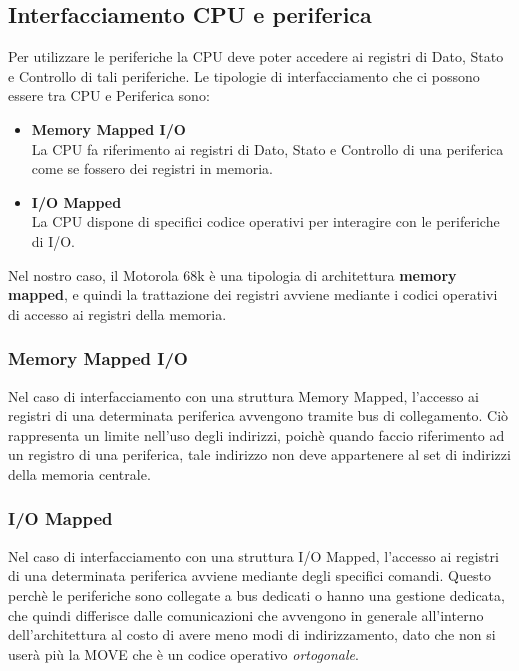 \subsection{Interfacciamento CPU e periferica}
Per utilizzare le periferiche la CPU deve poter accedere ai registri di Dato, Stato e Controllo di tali periferiche. Le tipologie di interfacciamento che ci possono essere tra CPU e Periferica sono:
\begin{itemize}
    \item \textbf{Memory Mapped I/O}\\ 
    La CPU fa riferimento ai registri di Dato, Stato e Controllo di una periferica come se fossero dei registri in memoria.
    \item \textbf{I/O Mapped}\\
    La CPU dispone di specifici codice operativi per interagire con le periferiche di I/O.
\end{itemize}

Nel nostro caso, il Motorola 68k è una tipologia di architettura \textbf{memory mapped}, e quindi la trattazione dei registri avviene mediante i codici operativi di accesso ai registri della memoria. 

\subsubsection{Memory Mapped I/O}
Nel caso di interfacciamento con una struttura Memory Mapped, l'accesso ai registri di una determinata periferica avvengono tramite bus di collegamento. Ciò rappresenta un limite nell'uso degli indirizzi, poichè quando faccio riferimento ad un registro di una periferica, tale indirizzo non deve appartenere al set di indirizzi della memoria centrale.

\subsubsection{I/O Mapped}
Nel caso di interfacciamento con una struttura I/O Mapped, l'accesso ai registri di una determinata periferica avviene mediante degli specifici comandi. Questo perchè le periferiche sono collegate a bus dedicati o hanno una gestione dedicata, che quindi differisce dalle comunicazioni che avvengono in generale all'interno dell'architettura al costo di avere meno modi di indirizzamento, dato che non si userà più la MOVE che è un codice operativo \textit{ortogonale}.

